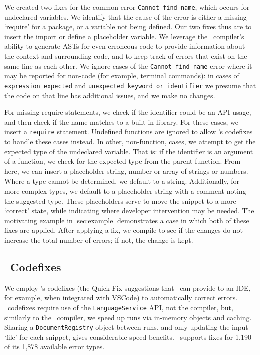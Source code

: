 \documentclass[conference]{IEEEtran}
\begin{document}
We created two fixes for the common error \texttt{Cannot find name}, which occurs for undeclared variables. We identify that the cause of the error is either a missing `require' for a package, or a variable not being defined. Our two fixes thus are to insert the import or define a placeholder variable. We leverage the \ts\ compiler's ability to generate ASTs for even erroneous code to provide information about the context and surrounding code, and to keep track of errors that exist on the same line as each other. We ignore cases of the \texttt{Cannot find name} error where it may be reported for non-code (for example, terminal commands): in cases of \texttt{expression expected} and \texttt{unexpected keyword or identifier} we presume that the code on that line has additional issues, and we make no changes. 

For missing require statements, we check if the identifier could be an API usage, and then check if the name matches to a built-in library. For these cases, we insert a \texttt{require} statement. Undefined functions are ignored to allow \ts{}'s codefixes to handle these cases instead. In other, non-function, cases, we attempt to get the expected type of the undeclared variable. That is: if the identifier is an argument of a function, we check for the expected type from the parent function. From here, we can insert a placeholder string, number or array of strings or numbers. Where a type cannot be determined, we default to a string. Additionally, for more complex types, we default to a placeholder string with a comment noting the suggested type. These placeholders serve to move the snippet to a more `correct' state, while indicating where developer intervention may be needed. The motivating example in \autoref{sec:example} demonstrates a case in which both of these fixes are applied. After applying a fix, we compile to see if the changes do not increase the total number of errors; if not, the change is kept.

\subsection{\ts\ Codefixes}

We employ \ts{}'s codefixes (the Quick Fix suggestions that \ts\ can provide to an IDE, for example, when integrated with VSCode) to automatically correct errors. \ts\ codefixes require use of the \texttt{LanguageService} API, not the compiler, but, similarly to the \ts\ compiler, we speed up runs via in-memory objects and caching. Sharing a \texttt{DocumentRegistry} object between runs, and only updating the input `file' for each snippet, gives considerable speed benefits. \ts\ supports fixes for 1,190 of its 1,878 available error types.
\end{document}
